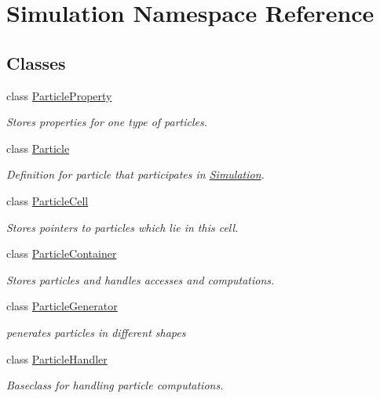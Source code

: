 \hypertarget{namespaceSimulation}{\section{Simulation Namespace Reference}
\label{namespaceSimulation}
}
\subsection*{Classes}
\begin{DoxyCompactItemize}
\item 
class \hyperlink{classSimulation_1_1ParticleProperty}{Particle\-Property}
\begin{DoxyCompactList}\small\item\em Stores properties for one type of particles. \end{DoxyCompactList}\item 
class \hyperlink{classSimulation_1_1Particle}{Particle}
\begin{DoxyCompactList}\small\item\em Definition for particle that participates in \hyperlink{namespaceSimulation}{Simulation}. \end{DoxyCompactList}\item 
class \hyperlink{classSimulation_1_1ParticleCell}{Particle\-Cell}
\begin{DoxyCompactList}\small\item\em Stores pointers to particles which lie in this cell. \end{DoxyCompactList}\item 
class \hyperlink{classSimulation_1_1ParticleContainer}{Particle\-Container}
\begin{DoxyCompactList}\small\item\em Stores particles and handles accesses and computations. \end{DoxyCompactList}\item 
class \hyperlink{classSimulation_1_1ParticleGenerator}{Particle\-Generator}
\begin{DoxyCompactList}\small\item\em penerates particles in different shapes \end{DoxyCompactList}\item 
class \hyperlink{classSimulation_1_1ParticleHandler}{Particle\-Handler}
\begin{DoxyCompactList}\small\item\em Baseclass for handling particle computations. \end{DoxyCompactList}\item 

\end{DoxyCompactItemize}
